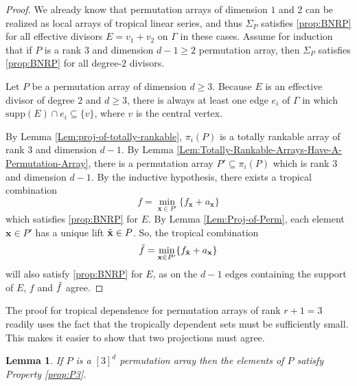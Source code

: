 \documentclass{amsart}
\newtheorem{lemma}[theorem]{Lemma}
\begin{document}
	\begin{proof}
		We already know that permutation arrays of dimension $1$ and $2$ can be realized as local arrays of tropical linear series, and thus $\Sigma_P$ satisfies \ref{prop:BNRP} for all effective divisors $E = v_1 + v_2$ on $\Gamma$ in these cases. Assume for induction that if $P$ is a rank $3$ and dimension $d-1 \geq 2$ permutation array, then $\Sigma_P$ satisfies \ref{prop:BNRP} for all degree-$2$ divisors.
		
		Let $P$ be a permutation array of dimension $d \geq 3$. Because $E$ is an effective divisor of degree $2$ and $d \geq 3$, there is always at least one edge $e_i$ of $\Gamma$ in which $\mathrm{supp}(E) \cap e_i \subseteq \{ v \}$, where $v$ is the central vertex. 
		
		By Lemma \ref{Lem:proj-of-totally-rankable}, $\pi_i(P)$ is a totally rankable array of rank $3$ and dimension $d-1$. By Lemma \ref{Lem:Totally-Rankable-Arrays-Have-A-Permutation-Array}, there is a permutation array $P' \subseteq \pi_i(P)$ which is rank $3$ and dimension $d-1$. By the inductive hypothesis, there exists a tropical combination $$f = \min_{\mathbf{x} \in P'} \{ f_{\mathbf{x}} + a_{\mathbf{x}} \}$$ which satisfies \ref{prop:BNRP} for $E$. By Lemma \ref{Lem:Proj-of-Perm}, each element $\mathbf{x} \in P'$ has a unique lift $\Tilde{\mathbf{x}} \in P$. So, the tropical combination $$\Tilde{f} = \min_{\mathbf{x} \in P'} \{ f_{\Tilde{\mathbf{x}}} + a_{\mathbf{x}} \}$$ will also satisfy \ref{prop:BNRP} for $E$, as on the $d-1$ edges containing the support of $E$, $f$ and $\Tilde{f}$ agree.
	\end{proof}
	
	The proof for tropical dependence for permutation arrays of rank $r+1=3$ readily uses the fact that the tropically dependent sets must be sufficiently small. This makes it easier to show that two projections must agree.
	
	\begin{lemma}
		\label{Lem:tropdep-realization-rk2}
		If $P$ is a $[3]^d$ permutation array then the elements of $P$ satisfy Property \ref{prop:P3}.
	\end{lemma}
	
\end{document}
